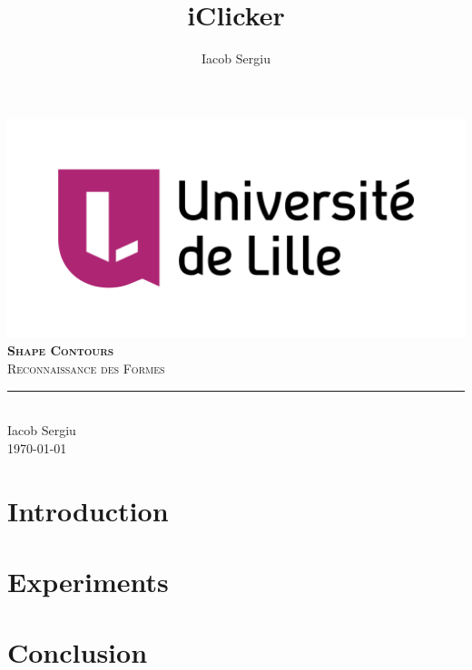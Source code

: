 \documentclass[11pt,titlepage]{report}
\author{Iacob Sergiu}
\title{iClicker}
\begin{document}
\begin{titlepage}
	\centering
    \includegraphics[width=0.75\linewidth]{images/universite_de_lille.png}\\[0.25cm] 	%
    \vspace{\fill}
    \textbf{\textsc{\fontsize{50}{50}\selectfont Shape Contours}}\\ \vspace{\fill}		
	\textsc{\LARGE Reconnaissance des Formes}\\[0.4cm]
	\rule{\linewidth}{0.2 mm} \\[0.5 cm]
    Iacob Sergiu \\[2cm]
	\today
\end{titlepage}
\restoregeometry

\tableofcontents

\chapter{Introduction}


\chapter{Experiments}


\chapter{Conclusion}


\clearpage
\pagestyle{numberonly}

\printbibliography
\end{document}

